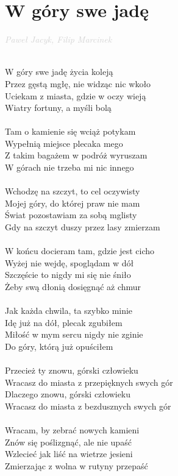 \documentclass[a5paper, 10pt]{book}
\begin{document}
\section{W góry swe jadę}\textcolor{lightgray}{\textit{Paweł Jacyk, Filip Marcinek}}\\~\\
\begin{minipage}[t]{0.6\textwidth}
W góry swe jadę życia koleją\\
Przez gęstą mgłę, nie widząc nic wkoło\\
Uciekam z miasta, gdzie w oczy wieją\\
Wiatry fortuny, a myśli bolą\\
\\
Tam o kamienie się wciąż potykam\\
Wypełnią miejsce plecaka mego\\
Z takim bagażem w podróż wyruszam\\
W górach nie trzeba mi nic innego\\
\\
Wchodzę na szczyt, to cel oczywisty\\
Mojej góry, do której praw nie mam\\
Świat pozostawiam za sobą mglisty\\
Gdy na szczyt duszy przez lasy zmierzam\\
\\
W końcu docieram tam, gdzie jest cicho\\
Wyżej nie wejdę, spoglądam w dół\\
Szczęście to nigdy mi się nie śniło\\
Żeby swą dłonią dosięgnąć aż chmur\\
\\
Jak każda chwila, ta szybko minie\\
Idę już na dół, plecak zgubiłem\\
Miłość w mym sercu nigdy nie zginie\\
Do góry, którą już opuściłem\\
\\
\hspace*{4mm}Przecież ty znowu, górski człowieku\\
\hspace*{4mm}Wracasz do miasta z przepięknych swych gór\\
\hspace*{4mm}Dlaczego znowu, górski człowieku\\
\hspace*{4mm}Wracasz do miasta z bezdusznych swych gór\\
\\
Wracam, by zebrać nowych kamieni\\
Znów się poślizgnąć, ale nie upaść\\
Wzlecieć jak liść na wietrze jesieni\\
Zmierzając z wolna w rutyny przepaść\\

\end{minipage}
\end{document}
